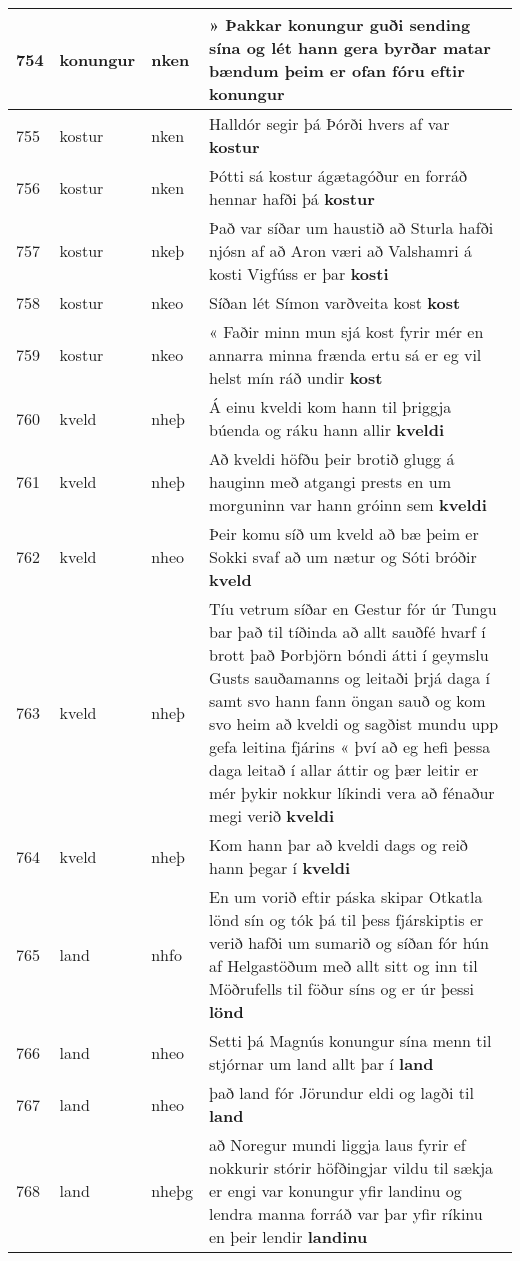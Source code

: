 \documentclass{article}
\begin{document}
\begin{longtable}{p{1cm}|p{1cm}|p{1cm}|p{13cm}}
\hline
754&konungur&nken&» Þakkar konungur guði sending sína og lét hann gera byrðar matar bændum þeim er ofan fóru eftir \textbf{konungur} \\
\hline
755&kostur&nken&Halldór segir þá Þórði hvers af var \textbf{kostur} \\
\hline
756&kostur&nken&Þótti sá kostur ágætagóður en forráð hennar hafði þá \textbf{kostur} \\
\hline
757&kostur&nkeþ&Það var síðar um haustið að Sturla hafði njósn af að Aron væri að Valshamri á kosti Vigfúss er þar \textbf{kosti} \\
\hline
758&kostur&nkeo&Síðan lét Símon varðveita kost \textbf{kost} \\
\hline
759&kostur&nkeo&« Faðir minn mun sjá kost fyrir mér en annarra minna frænda ertu sá er eg vil helst mín ráð undir \textbf{kost} \\
\hline
760&kveld&nheþ&Á einu kveldi kom hann til þriggja búenda og ráku hann allir \textbf{kveldi} \\
\hline
761&kveld&nheþ&Að kveldi höfðu þeir brotið glugg á hauginn með atgangi prests en um morguninn var hann gróinn sem \textbf{kveldi} \\
\hline
762&kveld&nheo&Þeir komu síð um kveld að bæ þeim er Sokki svaf að um nætur og Sóti bróðir \textbf{kveld} \\
\hline
763&kveld&nheþ&Tíu vetrum síðar en Gestur fór úr Tungu bar það til tíðinda að allt sauðfé hvarf í brott það Þorbjörn bóndi átti í geymslu Gusts sauðamanns og leitaði þrjá daga í samt svo hann fann öngan sauð og kom svo heim að kveldi og sagðist mundu upp gefa leitina fjárins « því að eg hefi þessa daga leitað í allar áttir og þær leitir er mér þykir nokkur líkindi vera að fénaður megi verið \textbf{kveldi} \\
\hline
764&kveld&nheþ&Kom hann þar að kveldi dags og reið hann þegar í \textbf{kveldi} \\
\hline
765&land&nhfo&En um vorið eftir páska skipar Otkatla lönd sín og tók þá til þess fjárskiptis er verið hafði um sumarið og síðan fór hún af Helgastöðum með allt sitt og inn til Möðrufells til föður síns og er úr þessi \textbf{lönd} \\
\hline
766&land&nheo&Setti þá Magnús konungur sína menn til stjórnar um land allt þar í \textbf{land} \\
\hline
767&land&nheo&það land fór Jörundur eldi og lagði til \textbf{land} \\
\hline
768&land&nheþg&að Noregur mundi liggja laus fyrir ef nokkurir stórir höfðingjar vildu til sækja er engi var konungur yfir landinu og lendra manna forráð var þar yfir ríkinu en þeir lendir \textbf{landinu} \\

\end{longtable}
\end{document}

